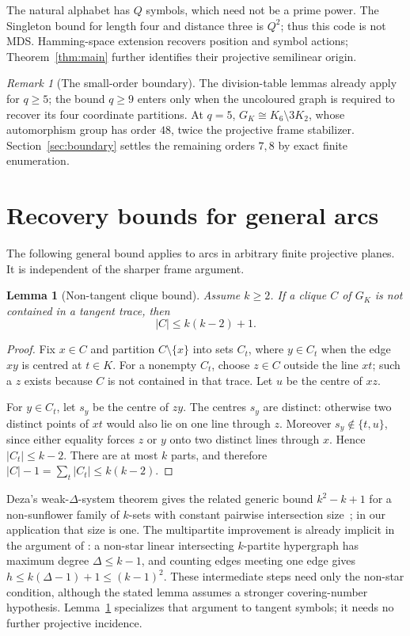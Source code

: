 \documentclass[11pt]{article}
\newtheorem{lemma}[theorem]{Lemma}
\theoremstyle{definition}
\theoremstyle{remark}
\newtheorem{remark}[theorem]{Remark}
\begin{document}
The natural alphabet has $Q$ symbols, which need not be a prime power.
The Singleton bound for length four and distance three is $Q^2$;
thus this code is not MDS. Hamming-space extension recovers position and
symbol actions; Theorem~\ref{thm:main} further identifies their projective
semilinear origin.

\begin{remark}[The small-order boundary]\label{rem:small-order}
The division-table lemmas already apply for $q\geq5$; the bound $q\geq9$ enters
only when the uncoloured graph is required to recover its four coordinate
partitions.  At $q=5$, $G_K\cong K_6\setminus3K_2$, whose automorphism group
has order $48$, twice the projective frame stabilizer.  Section~\ref{sec:boundary} settles the remaining orders $7,8$
by exact finite enumeration.
\end{remark}


\section{Recovery bounds for general arcs}\label{sec:general-recovery}

The following general bound applies to arcs in arbitrary finite projective
planes. It is independent of the sharper frame argument.

\begin{lemma}[Non-tangent clique bound]\label{lem:clique}
Assume $k\geq2$.  If a clique $C$ of $G_K$ is not contained in a tangent
trace, then
\[
  |C|\leq k(k-2)+1.
\]
\end{lemma}

\begin{proof}
Fix $x\in C$ and partition $C\setminus\{x\}$ into sets $C_t$, where
$y\in C_t$ when the edge $xy$ is centred at $t\in K$.  For a nonempty
$C_t$, choose $z\in C$ outside the line $xt$; such a $z$ exists because
$C$ is not contained in that trace.  Let $u$ be the centre of $xz$.

For $y\in C_t$, let $s_y$ be the centre of $zy$.  The centres $s_y$ are
distinct: otherwise two distinct points of $xt$ would also lie on one line
through $z$.  Moreover $s_y\notin\{t,u\}$, since either equality forces
$z$ or $y$ onto two distinct lines through $x$.  Hence $|C_t|\leq k-2$.
There are at most $k$ parts, and therefore
$|C|-1=\sum_t|C_t|\leq k(k-2)$.
\end{proof}

Deza's weak-$\Delta$-system theorem gives the related generic bound
$k^2-k+1$ for a non-sunflower family of $k$-sets with constant pairwise
intersection size~\cite{Deza}; in our application that size is one.
The multipartite improvement is already implicit in the argument of
\cite[Lemma 2.2]{FHMW}: a non-star linear intersecting $k$-partite
hypergraph has maximum degree $\Delta\le k-1$, and counting edges meeting
one edge gives $h\le k(\Delta-1)+1\le(k-1)^2$. These intermediate steps
need only the non-star condition, although the stated lemma assumes a
stronger covering-number hypothesis. Lemma~\ref{lem:clique} specializes
that argument to tangent symbols; it needs no further projective incidence.
\end{document}
